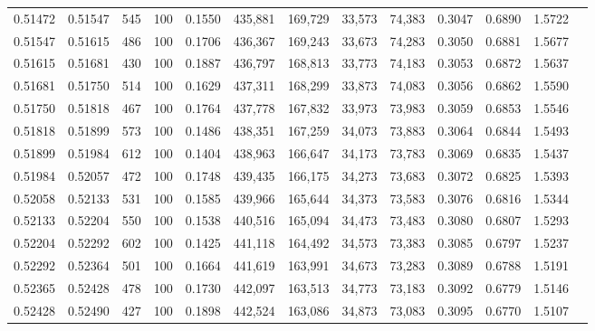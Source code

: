\begin{tabular}{rrrrrrrrrrrrr}
0.51472 & 0.51547 &   545 & 100 &                                     0.1550 & 435,881 & 169,729 &  33,573 &  74,383 & 0.3047 & 0.6890 & 1.5722 \\
0.51547 & 0.51615 &   486 & 100 &                                     0.1706 & 436,367 & 169,243 &  33,673 &  74,283 & 0.3050 & 0.6881 & 1.5677 \\
0.51615 & 0.51681 &   430 & 100 &                                     0.1887 & 436,797 & 168,813 &  33,773 &  74,183 & 0.3053 & 0.6872 & 1.5637 \\
0.51681 & 0.51750 &   514 & 100 &                                     0.1629 & 437,311 & 168,299 &  33,873 &  74,083 & 0.3056 & 0.6862 & 1.5590 \\
0.51750 & 0.51818 &   467 & 100 &                                     0.1764 & 437,778 & 167,832 &  33,973 &  73,983 & 0.3059 & 0.6853 & 1.5546 \\
0.51818 & 0.51899 &   573 & 100 &                                     0.1486 & 438,351 & 167,259 &  34,073 &  73,883 & 0.3064 & 0.6844 & 1.5493 \\
0.51899 & 0.51984 &   612 & 100 &                                     0.1404 & 438,963 & 166,647 &  34,173 &  73,783 & 0.3069 & 0.6835 & 1.5437 \\
0.51984 & 0.52057 &   472 & 100 &                                     0.1748 & 439,435 & 166,175 &  34,273 &  73,683 & 0.3072 & 0.6825 & 1.5393 \\
0.52058 & 0.52133 &   531 & 100 &                                     0.1585 & 439,966 & 165,644 &  34,373 &  73,583 & 0.3076 & 0.6816 & 1.5344 \\
0.52133 & 0.52204 &   550 & 100 &                                     0.1538 & 440,516 & 165,094 &  34,473 &  73,483 & 0.3080 & 0.6807 & 1.5293 \\
0.52204 & 0.52292 &   602 & 100 &                                     0.1425 & 441,118 & 164,492 &  34,573 &  73,383 & 0.3085 & 0.6797 & 1.5237 \\
0.52292 & 0.52364 &   501 & 100 &                                     0.1664 & 441,619 & 163,991 &  34,673 &  73,283 & 0.3089 & 0.6788 & 1.5191 \\
0.52365 & 0.52428 &   478 & 100 &                                     0.1730 & 442,097 & 163,513 &  34,773 &  73,183 & 0.3092 & 0.6779 & 1.5146 \\
0.52428 & 0.52490 &   427 & 100 &                                     0.1898 & 442,524 & 163,086 &  34,873 &  73,083 & 0.3095 & 0.6770 & 1.5107 \\

\end{tabular}
